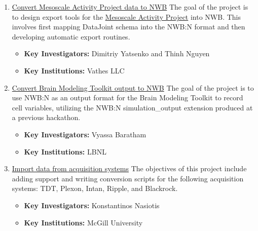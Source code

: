 \documentclass{article}
\begin{document}
\begin{enumerate}
    \item \href{https://neurodatawithoutborders.github.io/nwb_hackathons/HCK06_2019_Janelia/projects/Mesoscale_Activity_Project_to_NWB/}{Convert Mesoscale Activity Project data to NWB} The goal of the project is to design export tools for the \href{https://github.com/vathes/map-ephys}{Mesoscale Activity Project} into NWB. This involves first mapping DataJoint schema into the NWB:N format and then developing automatic export routines. 
        \vspace{-0.2cm}
        \begin{itemize}[noitemsep]
            \item \textbf{Key Investigators:} Dimitriy Yatsenko and Thinh Nguyen
            \item \textbf{Key Institutions:} Vathes LLC
        \end{itemize}
        
    \item \href{https://neurodatawithoutborders.github.io/nwb_hackathons/HCK06_2019_Janelia/projects/bmtk_nwb/}{Convert Brain Modeling Toolkit output to NWB} The goal of the project is to use NWB:N as an output format for the Brain Modeling Toolkit to record cell variables, utilizing the NWB:N simulation\_output extension produced at a previous hackathon.
        \vspace{-0.2cm}
        \begin{itemize}[noitemsep]
            \item \textbf{Key Investigators:} Vyassa Baratham
            \item \textbf{Key Institutions:} LBNL
        \end{itemize}
        
    \item \href{https://neurodatawithoutborders.github.io/nwb_hackathons/HCK06_2019_Janelia/projects/AcquisitionSystemImporters/}{Import data from acquisition systems} The objectives of this project include adding support and writing conversion scripts for the following acquisition systems: TDT, Plexon, Intan, Ripple, and Blackrock. 
        \vspace{-0.2cm}
        \begin{itemize}[noitemsep]
            \item \textbf{Key Investigators:} Konstantinos Nasiotis
            \item \textbf{Key Institutions:} McGill University
        \end{itemize}
        
    \setcounter{projectEnumCounter}{\theenumi}
\end{enumerate}
\end{document}
